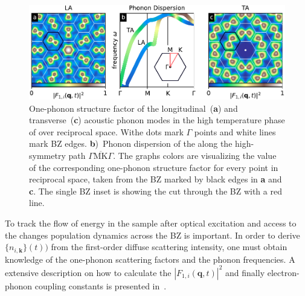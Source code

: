 \begin{figure}[!t]
	\includegraphics[width=\columnwidth]{figs/ops.pdf}
	\caption{One-phonon structure factor of the longitudinal~(\textbf{a}) and transverse~(\textbf{c}) acoustic phonon modes in the high temperature phase of \ts over reciprocal space. Withe dots mark $\Gamma$ points and white lines mark \ac{BZ} edges. \textbf{b})~Phonon dispersion of the along the high-symmetry path $\overline{\Gamma\mathrm{MK}\Gamma}$. The graphs colors are visualizing the value of the corresponding one-phonon structure factor for every point in reciprocal space, taken from the \ac{BZ} marked by black edges in \textbf{a} and \textbf{c}. The single \ac{BZ} inset is showing the cut through the \ac{BZ} with a red line.}
	\label{fig:ops}
\end{figure}

To track the flow of energy in the sample after optical excitation and access to the changes population dynamics across the \ac{BZ} is important.
In order to derive $\{n_{i,\mathbf{k}}\}(t))$ from the first-order diffuse scattering intensity, one must obtain knowledge of the one-phonon scattering factors and the phonon frequencies.
A extensive description on how to calculate the $\left| F_{1,i}(\mathbf{q},t) \right|^2$ and finally electron-phonon coupling constants is presented in~\cite{stern2018,renedecotret2019}.

